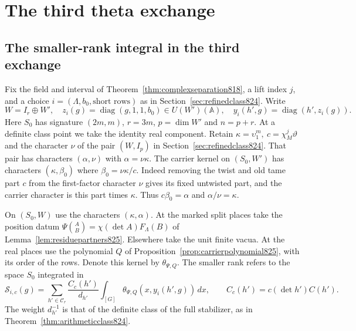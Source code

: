 \documentclass[a4paper,11pt]{article}
\theoremstyle{definition}
\theoremstyle{remark}
\numberwithin{equation}{section}
\begin{document}
\section{The third theta exchange}\label{nav:third-exchange}

\subsection{The smaller-rank integral in the third exchange}
\label{sec:smallthird834}
Fix the field and interval of Theorem~\ref{thm:complexseparation818},
a lift index \(j\), and a choice \(i=(\Lambda,b_0,\text{short rows})\)
as in Section~\ref{sec:refinedclass824}. Write
\[
 W=I_r\oplus W',\quad
 z_i(g)=\operatorname{diag}(g,1,1,b_0)\in U(W')(\mathbb A),
 \quad y_i(h',g)=\operatorname{diag}(h',z_i(g)).
\]
Here \(S_0\) has signature \((2m,m)\), \(r=3m\),
\(p=\dim W'\) and \(n=p+r\). At a definite class point
we take the identity real component. Retain
\(\kappa=\upsilon_1^m,\ c=\chi_M^j\vartheta\) and the
character \(\nu\) of the pair \((W,I_p)\) in
Section~\ref{sec:refinedclass824}. That pair has characters
\((\alpha,\nu)\) with \(\alpha=\nu\kappa\). The carrier
kernel on \((S_0,W')\) has characters \((\kappa,\beta_0)\)
where \(\beta_0=\nu\kappa/c\). Indeed removing the twist
and old tame part \(c\) from the first-factor character
\(\nu\) gives its fixed untwisted part, and the carrier
character is this part times \(\kappa\). Thus
\(c\beta_0=\alpha\) and \(\alpha/\nu=\kappa\).

On \((S_0,W)\) use the characters \((\kappa,\alpha)\).
At the marked split places take the position datum
\(\Psi\binom{A}{B}=\chi(\det A)F_\Lambda(B)\) of
Lemma~\ref{lem:residuepartners825}. Elsewhere take the
unit finite vacua. At the real places use the polynomial
\(Q\) of Proposition~\ref{prop:carrierpolynomial825}, with
its order of the rows. Denote this kernel by \(\theta_{\Psi,Q}\).
The smaller rank refers to the space \(S_0\) integrated in
\[
 \mathcal S_{i,c}(g)=
 \sum_{h'\in\mathcal C_r}\frac{C_c(h')}{d_{h'}}
       \int_{[G]}\theta_{\Psi,Q}(x,y_i(h',g))\,dx,\qquad
 C_c(h')=c(\det h')C(h').
\]
The weight \(d_{h'}^{-1}\) is that of the definite class
of the full stabilizer, as in Theorem~\ref{thm:arithmeticclass824}.
\end{document}
